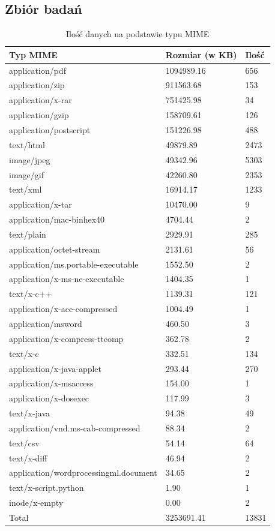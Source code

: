 \subsection{Zbiór badań}
\begin{table}[h]
    \centering
    \begin{tabular}{|l|l|l|}
        \hline
        \textbf{Typ MIME} & \textbf{Rozmiar (w KB)} & \textbf{Ilość} \\
        \hline
application/pdf & 1094989.16 & 656 \\
application/zip & 911563.68 & 153 \\
application/x-rar & 751425.98 & 34 \\
application/gzip & 158709.61 & 126 \\
application/postscript & 151226.98 & 488 \\
text/html & 49879.89 & 2473 \\
image/jpeg & 49342.96 & 5303 \\
image/gif & 42260.80 & 2353 \\
text/xml & 16914.17 & 1233 \\
application/x-tar & 10470.00 & 9 \\
application/mac-binhex40 & 4704.44 & 2 \\
text/plain & 2929.91 & 285 \\
application/octet-stream & 2131.61 & 56 \\
application/ms.portable-executable & 1552.50 & 2 \\
application/x-ms-ne-executable & 1404.35 & 1 \\
text/x-c++ & 1139.31 & 121 \\
application/x-ace-compressed & 1004.49 & 1 \\
application/msword & 460.50 & 3 \\
application/x-compress-ttcomp & 362.78 & 2 \\
text/x-c & 332.51 & 134 \\
application/x-java-applet & 293.44 & 270 \\
application/x-msaccess & 154.00 & 1 \\
application/x-dosexec & 117.99 & 3 \\
text/x-java & 94.38 & 49 \\
application/vnd.ms-cab-compressed & 88.34 & 2 \\
text/csv & 54.14 & 64 \\
text/x-diff & 46.94 & 2 \\
application/wordprocessingml.document & 34.65 & 2 \\
text/x-script.python & 1.90 & 1 \\
inode/x-empty & 0.00 & 2 \\
Total & 3253691.41 & 13831 \\
        \hline
    \end{tabular}
    \caption{Ilość danych na podstawie typu MIME}
    \label{tabela:typy-MIME-z-iloscia}
\end{table}
